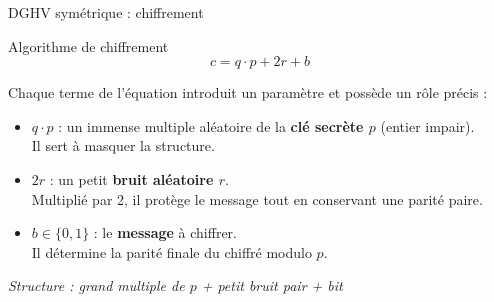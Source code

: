 \documentclass[10pt,aspectratio=169]{beamer}
\begin{document}


\begin{frame}{DGHV symétrique : chiffrement}
  \begin{block}{Algorithme de chiffrement}
    \[
      c = q \cdot p + 2r + b
    \]
  \end{block}

  Chaque terme de l'équation introduit un paramètre et possède un rôle précis :
  \begin{itemize}
    \item \textbf{$q \cdot p$} : un immense multiple aléatoire de la \textbf{clé secrète $p$} (entier impair). \\ 
    Il sert à masquer la structure.
    \item \textbf{$2r$} : un petit \textbf{bruit aléatoire $r$}. \\
    Multiplié par 2, il protège le message tout en conservant une parité paire.
    \item \textbf{$b \in \{0,1\}$} : le \textbf{message} à chiffrer. \\
    Il détermine la parité finale du chiffré modulo $p$.
  \end{itemize}

  \vspace{0.2cm}
  \begin{center}
    \textit{Structure : grand multiple de $p$ \quad + \quad petit bruit pair \quad + \quad bit}
  \end{center}
\end{frame}
\end{document}
